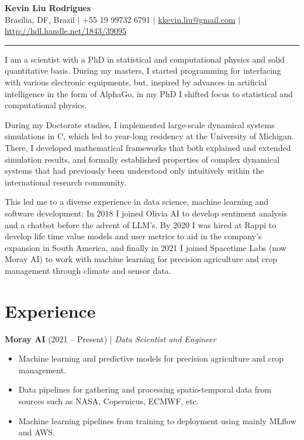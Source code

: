 \documentclass[10pt,a4paper]{article}
\begin{document}
\begin{center}
    {\LARGE \textbf{Kevin Liu Rodrigues}}  \\
    \vspace{2pt}
    Brasília, DF, Brazil $|$ +55 19 99732 6791  $|$ \href{mailto:kkevin.liu@gmail.com}{kkevin.liu@gmail.com} $|$
	\href{http://hdl.handle.net/1843/39095}{http://hdl.handle.net/1843/39095}
\end{center}

\noindent\rule{\textwidth}{0.4pt} I am a scientist with a PhD in statistical and computational physics and solid
quantitative basis. During my masters, I started programming for interfacing with various electronic equipments, but,
inspired by advances in artificial intelligence in the form of AlphaGo, in my PhD I shifted focus to statistical and
computational physics.

During my Doctorate studies, I implemented large-scale dynamical systems simulations in C, which led to year-long
residency at the University of Michigan. There, I developed mathematical frameworks that both explained and extended
simulation results, and formally established properties of complex dynamical systems that had previously been understood
only intuitively within the international research community.

This led me to a diverse experience in data science, machine learning and software development: In 2018 I joined Olivia
AI to develop sentiment analysis and a chatbot before the advent of LLM's. By 2020 I was hired at Rappi to develop life
time value models and user metrics to aid in the company's expansion in South America, and finally in 2021 I joined
Spacetime Labs (now Moray AI) to work with machine learning for precision agriculture and crop management through
climate and sensor data.

\section{Experience}

\textbf{Moray AI} (2021 -- Present) | \textit{Data Scientist and Engineer} 
\begin{itemize}[noitemsep, topsep=0pt]
    \item Machine learning and predictive models for precision agriculture and crop management.
    \item Data pipelines for gathering and processing spatio-temporal data from sources such as NASA, Copernicus, ECMWF, etc.
    \item Machine learning pipelines from training to deployment using mainly MLflow and AWS.
\end{itemize}
\end{document}
